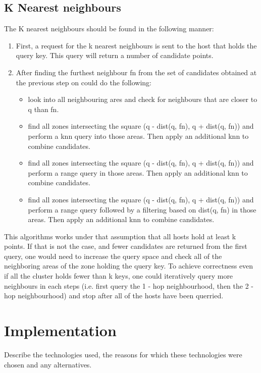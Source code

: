 \documentclass[11pt,a4paper]{globis-book}
\begin{document}
\subsection{K Nearest neighbours}
The K nearest neighbours should be found in the following manner:
\begin{enumerate}
    \item First, a request for the k nearest neighbours is sent to the host that holds the query key. This query will return a number of candidate points.
    \item After finding the furthest neighbour fn from the set of candidates obtained at the previous step on could do the following:
        \begin{itemize}
            \item look into all neighbouring ares and check for neighbours that are closer to q than fn.
            \item find all zones intersecting the square (q - dist(q, fn), q + dist(q, fn)) and perform a knn query into those areas. Then apply an additional knn to combine candidates.
            \item find all zones intersecting the square (q - dist(q, fn), q + dist(q, fn)) and perform a range query in those areas. Then apply an additional knn to combine candidates.
            \item find all zones intersecting the square (q - dist(q, fn), q + dist(q, fn)) and perform a range query followed by a filtering based on dist(q, fn) in those areas. Then apply an additional knn to combine candidates.
        \end{itemize}
\end{enumerate}

This algorithms works under that assumption that all hosts hold at least k points. If that is not the case, and fewer candidates are returned from the first query, one would need to increase the query space and check all of the neighboring areas of the zone holding the query key. To achieve correctness even if all the cluster holds fewer than k keys, one could iteratively query more neighbours in each steps (i.e. first query the 1 - hop neighbourhood, then the 2 - hop neighbourhood) and stop after all of the hosts have been querried.

\section{Implementation}
Describe the technologies used, the reasons for which these technologies were chosen and any alternatives.
\end{document}
